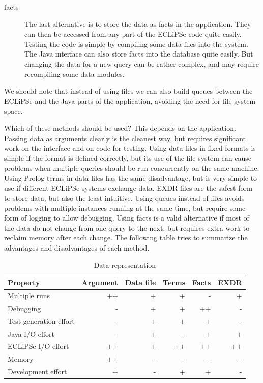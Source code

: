 \documentclass[a4paper,12pt]{report}
\begin{document}
\begin{description}
\item[facts] The last alternative is to store the data as facts in the application. They can then be accessed from any part of the ECLiPSe code quite easily. Testing the code is simple by compiling some data files into the system. The Java interface can also store facts into the database quite easily. But changing the data for a new query can be rather complex, and may require recompiling some data modules.

\end{description}

We should note that instead of using files we can also build queues between the ECLiPSe and the Java parts of the application, avoiding the need for file system space.

Which of these methods should be used? This depends on the application. Passing data as arguments clearly is the cleanest way, but requires significant work on the interface and on code for testing. Using data files in fixed formats is simple if the format is defined correctly, but its use of the file system can cause problems when multiple queries should be run concurrently on the same machine. Using Prolog terms in data files has the same disadvantage, but is very simple to use if different ECLiPSe systems exchange data. EXDR files are the safest form to store data, but also the least intuitive. Using queues instead of files avoids problems with multiple instances running at the same time, but require some form of logging to allow debugging. Using facts is a valid alternative if most of the data do not change from one query to the next, but requires extra work to reclaim memory after each change. The following table tries to summarize the advantages and disadvantages of each method.

\begin{table}[htbp]
\begin{center}
\begin{tabular}{|l|r|r|r|r|r|}
\hline
Property & Argument & Data file & Terms & Facts & EXDR\\
\hline
Multiple runs& ++ & + & + & - & +\\
\hline
Debugging & - & + & + & ++ & -\\
\hline
Test generation effort & -& + & + & + & -\\
\hline
Java I/O effort & - & + & - & + & +\\
\hline
ECLiPSe I/O effort & ++ & + & ++ & ++ & ++\\
\hline
Memory & ++ & - & -& - - & -\\
\hline
Development effort & + & - & + & + & -\\
\hline
\end{tabular}
\end{center}
\caption{\label{Data representation}Data representation}
\end{table}
\end{document}
